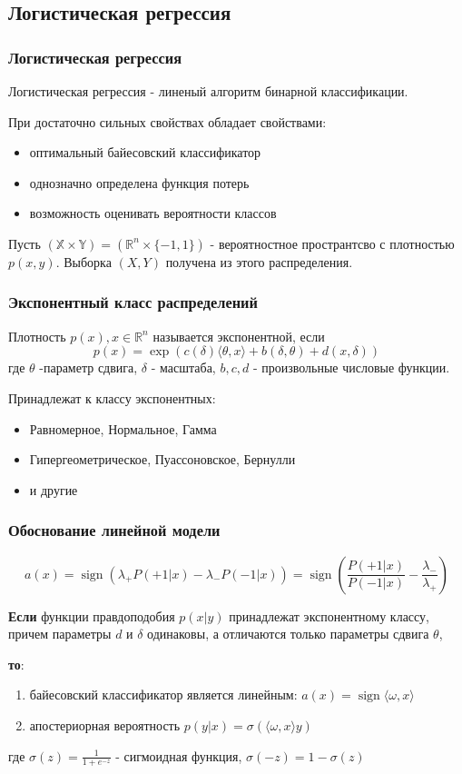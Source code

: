 \documentclass{beamer}
\DeclareMathOperator{\sign}{sign}
\begin{document}
	\subsection{Логистическая регрессия}
	
	\begin{frame}
		\frametitle{Логистическая регрессия}
		Логистическая регрессия - линеный алгоритм бинарной классификации.
		
		При достаточно сильных свойствах обладает свойствами:
		\begin{itemize}
			\item оптимальный байесовский классификатор
			\item однозначно определена функция потерь
			\item возможность оценивать вероятности классов
		\end{itemize}
		
		Пусть $(\mathbb{X}\times \mathbb{Y}) = (\mathbb{R}^{n} \times \{-1, 1\})$ - вероятностное пространтсво с плотностью $p(x, y)$. Выборка $(X, Y)$ получена из этого распределения.
	\end{frame}
	
	\begin{frame}
		\frametitle{Экспонентный класс распределений}
		Плотность $p(x), x \in \mathbb{R}^{n}$ называется экспонентной, если
		\[
			p(x) = \exp(c(\delta) \langle \theta, x \rangle + b(\delta, \theta) + d(x, \delta))
		\]
		 где $\theta$ -параметр сдвига, $\delta$ - масштаба, $b, c, d$ - произвольные числовые функции.
		 
		 \vspace{15pt}
		 
		 Принадлежат к классу экспонентных:
		 \begin{itemize}
		 	\item Равномерное, Нормальное, Гамма
		 	\item Гипергеометрическое, Пуассоновское, Бернулли
		 	\item и другие
		 \end{itemize}
	\end{frame}
	
	\begin{frame}
		\frametitle{Обоснование линейной модели}
		\[a(x) = \sign(\lambda_+ P(+1 | x) - \lambda_- P(-1 | x)) =
		\sign(\frac{P(+1 | x)}{P(-1 | x)} - \frac{\lambda_-}{\lambda_+})
		\]
		
		\textbf{Если} функции правдоподобия $p(x | y) $ принадлежат экспонентному классу, причем параметры $d$ и $\delta$ одинаковы, а отличаются только параметры сдвига $\theta$, 
		
		\textbf{то}:
		\begin{enumerate}
			\item байесовский классификатор является линейным: $a(x) = \sign \langle \omega, x \rangle$
			\item апостериорная вероятность $p(y | x) = \sigma(\langle \omega, x \rangle y)$
		\end{enumerate}
		
		где $\sigma(z) = \frac{1}{1 + e^{-z}}$ - сигмоидная функция, $\sigma(-z) = 1 - \sigma(z)$
	\end{frame}
	
\end{document}
